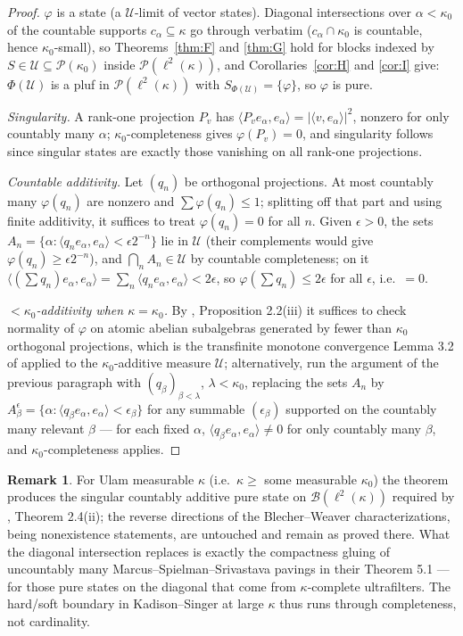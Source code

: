 \documentclass[11pt,reqno]{amsart}
\theoremstyle{definition}
\newtheorem{remark}[theorem]{Remark}
\newcommand{\PP}{\mathcal{P}}
\newcommand{\U}{\mathcal{U}}
\newcommand{\lk}{\ell^2(\kappa)}
\newcommand{\Blk}{\mathcal{B}(\ell^2(\kappa))}
\begin{document}
\begin{proof}
$\varphi$ is a state (a $\U$-limit of vector states). Diagonal intersections over
$\alpha<\kappa_0$ of the countable supports $c_\alpha\subseteq\kappa$ go through
verbatim ($c_\alpha\cap\kappa_0$ is countable, hence $\kappa_0$-small), so
Theorems~\ref{thm:F} and \ref{thm:G} hold for blocks indexed by $S\in\U\subseteq
\mathcal P(\kappa_0)$ inside $\PP(\lk)$, and Corollaries~\ref{cor:H} and \ref{cor:I}
give: $\Phi(\U)$ is a pluf in $\PP(\lk)$ with $S_{\Phi(\U)}=\{\varphi\}$, so $\varphi$
is pure.

\emph{Singularity.} A rank-one projection $P_v$ has
$\langle P_ve_\alpha,e_\alpha\rangle=|\langle v,e_\alpha\rangle|^2$, nonzero for only
countably many $\alpha$; $\kappa_0$-completeness gives $\varphi(P_v)=0$, and
singularity follows since singular states are exactly those vanishing on all rank-one
projections.

\emph{Countable additivity.} Let $(q_n)$ be orthogonal projections. At most countably
many $\varphi(q_n)$ are nonzero and $\sum\varphi(q_n)\le1$; splitting off that part and
using finite additivity, it suffices to treat $\varphi(q_n)=0$ for all $n$. Given
$\epsilon>0$, the sets
$A_n=\{\alpha:\langle q_ne_\alpha,e_\alpha\rangle<\epsilon2^{-n}\}$ lie in $\U$
(their complements would give $\varphi(q_n)\ge\epsilon2^{-n}$), and
$\bigcap_nA_n\in\U$ by countable completeness; on it
$\langle(\sum q_n)e_\alpha,e_\alpha\rangle=\sum_n\langle
q_ne_\alpha,e_\alpha\rangle<2\epsilon$, so $\varphi(\sum q_n)\le2\epsilon$ for all
$\epsilon$, i.e.\ $=0$.

\emph{$<\kappa_0$-additivity when $\kappa=\kappa_0$.} By \cite{BlecherWeaver},
Proposition 2.2(iii) it suffices to check normality of $\varphi$ on atomic abelian
subalgebras generated by fewer than $\kappa_0$ orthogonal projections, which is the
transfinite monotone convergence Lemma 3.2 of \cite{BlecherWeaver} applied to the
$\kappa_0$-additive measure $\U$; alternatively, run the argument of the previous
paragraph with $(q_\beta)_{\beta<\lambda}$, $\lambda<\kappa_0$, replacing the sets
$A_n$ by
$A^\epsilon_\beta=\{\alpha:\langle q_\beta e_\alpha,e_\alpha\rangle<\epsilon_\beta\}$
for any summable $(\epsilon_\beta)$ supported on the countably many relevant $\beta$
--- for each fixed $\alpha$, $\langle q_\beta e_\alpha,e_\alpha\rangle\neq0$ for only
countably many $\beta$, and $\kappa_0$-completeness applies.
\end{proof}

\begin{remark}
For Ulam measurable $\kappa$ (i.e.\ $\kappa\ge$ some measurable $\kappa_0$) the theorem
produces the singular countably additive pure state on $\Blk$ required by
\cite{BlecherWeaver}, Theorem 2.4(ii); the reverse directions of the Blecher--Weaver
characterizations, being nonexistence statements, are untouched and remain as proved
there. What the diagonal intersection replaces is exactly the compactness gluing of
uncountably many Marcus--Spielman--Srivastava pavings in their Theorem 5.1 --- for
those pure states on the diagonal that come from $\kappa$-complete ultrafilters. The
hard/soft boundary in Kadison--Singer at large $\kappa$ thus runs through completeness,
not cardinality.
\end{remark}
\end{document}
